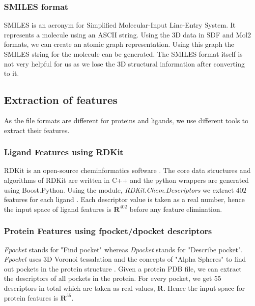 \documentclass[11pt]{article}
\begin{document}
\subsubsection{SMILES format}
SMILES is an acronym for Simplified Molecular-Input Line-Entry System.
It represents a molecule using an ASCII string.
Using the 3D data in SDF and Mol2 formats,  we can create an atomic graph representation.
Using this graph the SMILES string for the molecule can be generated.
The SMILES format itself is not very helpful for us as we lose the 3D structural information after converting to it.
\cite{smilesformat}

\subsection{Extraction of features}
As the file formats are different for proteins and ligands,  we use different tools to extract their features.
\subsubsection{Ligand Features using RDKit}
RDKit is an open-source cheminformatics software \cite{rdkitofficalpage}.
The core data structures and algorithms of RDKit are written in C++ and the
python wrappers are generated using Boost.Python.
Using the module, \textit{RDKit.Chem.Descriptors} we extract $402$ features for each ligand \cite{rdkitbioinformaticsfreiburg}.
Each descriptor value is taken as a real number,  hence the input space of ligand features is $\mathbf{R}^{402}$ before any feature elimination.

\subsubsection{Protein Features using fpocket/dpocket descriptors}
\textit{Fpocket} stands for "Find pocket" whereas \textit{Dpocket} stands for "Describe pocket".
\textit{Fpocket} uses 3D Voronoi tessalation and the concepts of "Alpha Spheres" to find out pockets in the protein structure \cite{fpocketmanual} \cite{voronoitesselationshortvideo}.
Given a protein PDB file, we can extract the descriptors of all pockets in the protein.
For every pocket, we get 55 descriptors in total which are taken as real values,  $\mathbf{R}$.
Hence the input space for protein features is $\mathbf{R}^{55}$.
\end{document}
